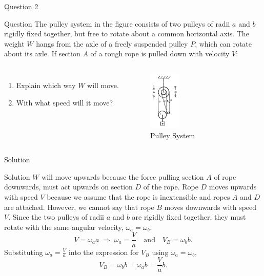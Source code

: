 \documentclass{beamer}
\begin{document}
    \begin{frame}{Question 2}
        \begin{block}{Question}
            The pulley system in the figure consists of two pulleys of radii $a$ and $b$ rigidly fixed together, but free to rotate about a common horizontal axis. The weight $W$ hangs from the axle of a freely suspended pulley $P$, which can rotate about its axle. If section $A$ of a rough rope is pulled down with velocity $V$: \pause

            \begin{columns}

                    \begin{enumerate}
                        \item Explain which way $W$ will move. \pause
                        \item With what speed will it move? \pause\\
                    \end{enumerate}
                
                    \begin{figure}
                        \centering
                        \includegraphics[width=15mm]{z20121b.png}
                        \caption{Pulley System}
                        \label{i1}
                    \end{figure}

            \end{columns}
        \end{block}
    \end{frame}

    \begin{frame}{Solution}
        \begin{exampleblock}{Solution}
            $W$ will move upwards because the force pulling section $A$ of rope downwards, must act upwards on section $D$ of the rope.\pause 
            Rope $D$ moves upwards with speed $V$ because we assume that the rope is inextensible and ropes $A$ and $D$ are attached.\pause
            However, we cannot say that rope $B$ moves downwards with speed $V$. Since the two pulleys of radii $a$ and $b$ are rigidly fixed together, they must rotate with the same angular velocity, $\omega_a = \omega_b$.
            \[V = \omega_aa \;\Rightarrow\; \omega_a = \frac{V}{a} \quad\text{and}\quad V_B = \omega_bb.\]\pause
            Substituting $\omega_a = \frac{V}{a}$ into the expression for $V_B$ using $\omega_a = \omega_b,$
            \[V_B = \omega_bb = \omega_ab = \frac{V}{a}b.\]
        \end{exampleblock}
    \end{frame}
\end{document}
